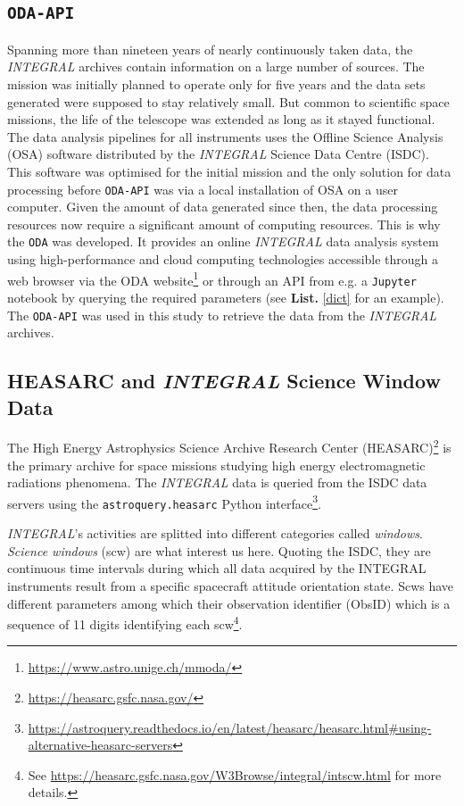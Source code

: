     \subsection{\texttt{ODA-API}}

    Spanning more than nineteen years of nearly continuously taken data, the \textit{INTEGRAL} archives contain information on a large number of sources. The mission was initially planned to operate only for five years and the data sets generated were supposed to stay relatively small. But common to scientific space missions, the life of the telescope was extended as long as it stayed functional. The data analysis pipelines for all instruments uses the Offline Science Analysis (OSA) software distributed by the \textit{INTEGRAL} Science Data Centre (ISDC). This software was optimised for the initial mission and the only solution for data processing before \texttt{ODA-API} was via a local installation of OSA on a user computer. Given the amount of data generated since then, the data processing resources now require a significant amount of computing resources. This is why the \texttt{ODA} was developed. It provides an online \textit{INTEGRAL} data analysis system using high-performance and cloud computing technologies accessible through a web browser via the ODA website\footnote{\url{https://www.astro.unige.ch/mmoda/}} or through an API from e.g. a \texttt{Jupyter} notebook by querying the required parameters (see \textbf{List.} \ref{dict} for an example). The \texttt{ODA-API} was used in this study to retrieve the data from the \textit{INTEGRAL} archives.

    \subsection{HEASARC and \textit{INTEGRAL} Science Window Data}

    The High Energy Astrophysics Science Archive Research Center (HEASARC)\footnote{\url{https://heasarc.gsfc.nasa.gov/}} is the primary archive for space missions studying high energy electromagnetic radiations phenomena. The \textit{INTEGRAL} data is queried from the ISDC data servers using the \texttt{astroquery.heasarc} Python interface\footnote{\url{https://astroquery.readthedocs.io/en/latest/heasarc/heasarc.html\#using-alternative-heasarc-servers}}.

    \textit{INTEGRAL}'s activities are splitted into different categories called \textit{windows}. \textit{Science windows} (scw) are what interest us here. Quoting the ISDC, they are continuous time intervals during which all data acquired by the INTEGRAL instruments result from a specific spacecraft attitude orientation state. Scws have different parameters among which their observation identifier (Obs\textunderscore ID) which is a sequence of 11 digits identifying each scw\footnote{See \url{https://heasarc.gsfc.nasa.gov/W3Browse/integral/intscw.html} for more details.}.
    


